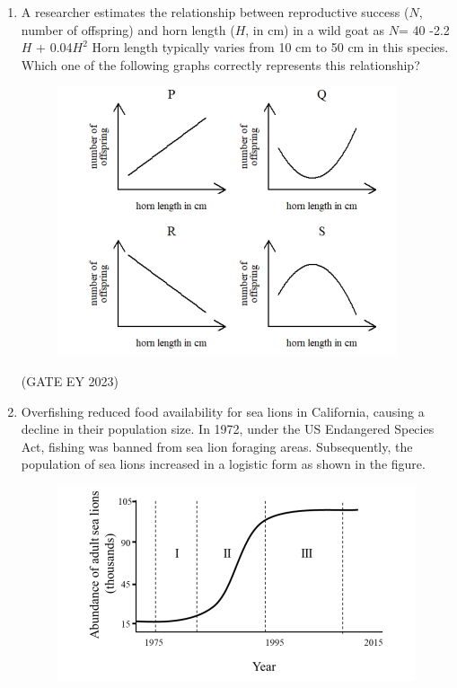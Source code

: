 \documentclass[journal,12pt,onecolumn]{IEEEtran}
\theoremstyle{remark}
\begin{document}
\begin{enumerate}
 \item A researcher estimates the relationship between reproductive success ($N$, number
of offspring) and horn length ($H$, in cm) in a wild goat as
$N$= 40 -2.2$H$ + 0.04$H^2$
Horn length typically varies from 10 cm to 50 cm in this species. Which one of the
following graphs correctly represents this relationship?
\begin{figure}[H]
    \centering
    \includegraphics[]{figs/Q.40.png}
    \caption{}
    \label{fig:5}
\end{figure}
   
\begin{enumerate}
\end{enumerate}


\hfill{(GATE EY 2023)}




 \item Overfishing reduced food availability for sea lions in California, causing a decline
in their population size. In 1972, under the US Endangered Species Act, fishing
was banned from sea lion foraging areas. Subsequently, the population of sea lions
increased in a logistic form as shown in the figure. 

\begin{figure}[H]
    \centering
    \includegraphics[]{figs/Q.41.png}
    \caption{}
    \label{fig:6}
\end{figure}
   

\end{enumerate}
\end{document}
